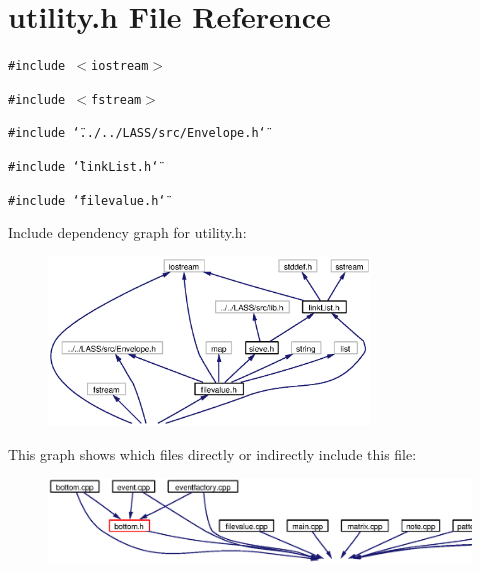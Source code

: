 \section{utility.h File Reference}
\label{utility_8h}
{\tt \#include $<$iostream$>$}\par
{\tt \#include $<$fstream$>$}\par
{\tt \#include \char`\"{}../../LASS/src/Envelope.h\char`\"{}}\par
{\tt \#include \char`\"{}link\-List.h\char`\"{}}\par
{\tt \#include \char`\"{}filevalue.h\char`\"{}}\par


Include dependency graph for utility.h:\begin{figure}[H]
\begin{center}
\leavevmode
\includegraphics[width=242pt]{utility_8h__incl}
\end{center}
\end{figure}


This graph shows which files directly or indirectly include this file:\begin{figure}[H]
\begin{center}
\leavevmode
\includegraphics[width=417pt]{utility_8h__dep__incl}
\end{center}
\end{figure}
